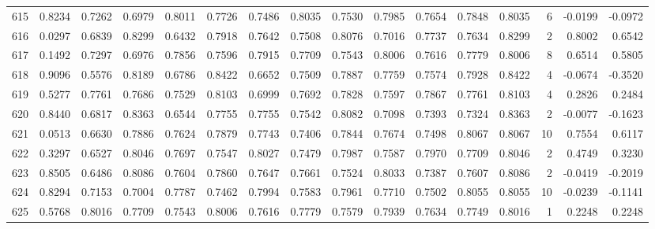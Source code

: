 \begin{tabular}{lrrrrrrrrrrrrrrr}
615 &      0.8234 &  0.7262 &  0.6979 &  0.8011 &  0.7726 &  0.7486 &  0.8035 &  0.7530 &  0.7985 &  0.7654 &   0.7848 &     0.8035 &      6 &                   -0.0199 &                    -0.0972 \\
616 &      0.0297 &  0.6839 &  0.8299 &  0.6432 &  0.7918 &  0.7642 &  0.7508 &  0.8076 &  0.7016 &  0.7737 &   0.7634 &     0.8299 &      2 &                    0.8002 &                     0.6542 \\
617 &      0.1492 &  0.7297 &  0.6976 &  0.7856 &  0.7596 &  0.7915 &  0.7709 &  0.7543 &  0.8006 &  0.7616 &   0.7779 &     0.8006 &      8 &                    0.6514 &                     0.5805 \\
618 &      0.9096 &  0.5576 &  0.8189 &  0.6786 &  0.8422 &  0.6652 &  0.7509 &  0.7887 &  0.7759 &  0.7574 &   0.7928 &     0.8422 &      4 &                   -0.0674 &                    -0.3520 \\
619 &      0.5277 &  0.7761 &  0.7686 &  0.7529 &  0.8103 &  0.6999 &  0.7692 &  0.7828 &  0.7597 &  0.7867 &   0.7761 &     0.8103 &      4 &                    0.2826 &                     0.2484 \\
620 &      0.8440 &  0.6817 &  0.8363 &  0.6544 &  0.7755 &  0.7755 &  0.7542 &  0.8082 &  0.7098 &  0.7393 &   0.7324 &     0.8363 &      2 &                   -0.0077 &                    -0.1623 \\
621 &      0.0513 &  0.6630 &  0.7886 &  0.7624 &  0.7879 &  0.7743 &  0.7406 &  0.7844 &  0.7674 &  0.7498 &   0.8067 &     0.8067 &     10 &                    0.7554 &                     0.6117 \\
622 &      0.3297 &  0.6527 &  0.8046 &  0.7697 &  0.7547 &  0.8027 &  0.7479 &  0.7987 &  0.7587 &  0.7970 &   0.7709 &     0.8046 &      2 &                    0.4749 &                     0.3230 \\
623 &      0.8505 &  0.6486 &  0.8086 &  0.7604 &  0.7860 &  0.7647 &  0.7661 &  0.7524 &  0.8033 &  0.7387 &   0.7607 &     0.8086 &      2 &                   -0.0419 &                    -0.2019 \\
624 &      0.8294 &  0.7153 &  0.7004 &  0.7787 &  0.7462 &  0.7994 &  0.7583 &  0.7961 &  0.7710 &  0.7502 &   0.8055 &     0.8055 &     10 &                   -0.0239 &                    -0.1141 \\
625 &      0.5768 &  0.8016 &  0.7709 &  0.7543 &  0.8006 &  0.7616 &  0.7779 &  0.7579 &  0.7939 &  0.7634 &   0.7749 &     0.8016 &      1 &                    0.2248 &                     0.2248 \\

\end{tabular}
